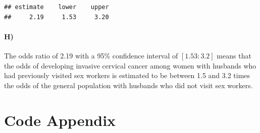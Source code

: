 \documentclass[
]{article}
\begin{document}
\begin{verbatim}
## estimate    lower    upper 
##     2.19     1.53     3.20
\end{verbatim}

\paragraph{H)}\label{h}

The odds ratio of 2.19 with a 95\% confidence interval of
\([1.53 : 3.2]\) means that the odds of developing invasive cervical
cancer among women with husbands who had previously visited sex workers
is estimated to be between 1.5 and 3.2 times the odds of the general
population with husbands who did not visit sex workers.

\pagebreak

\section{Code Appendix}\label{code-appendix}
\end{document}
